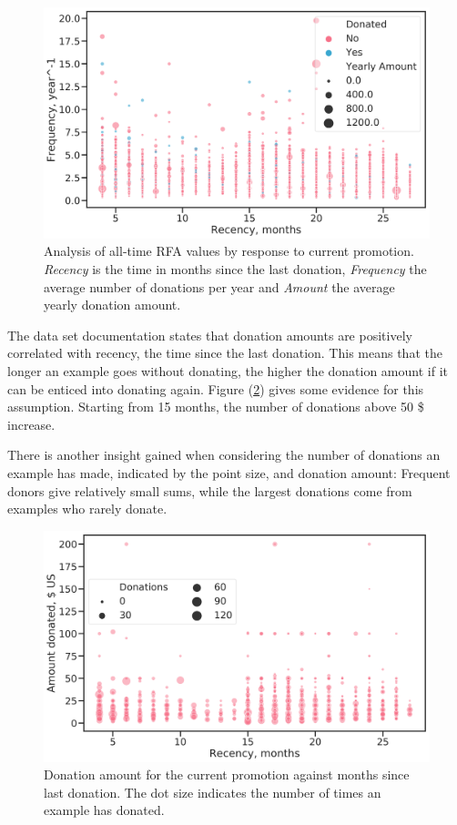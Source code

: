 \documentclass[
  11pt,
  a4paper,
  DIV=12,captions=tableheading,oneside,titlepage]{scrbook}
\begin{document}
\begin{figure}

{\centering \includegraphics[width=0.7\linewidth]{figures/eda/rfa-alltime-current-donors} 

}

\caption{Analysis of all-time RFA values by response to current promotion. \emph{Recency} is the time in months since the last donation, \emph{Frequency} the average number of donations per year and \emph{Amount} the average yearly donation amount.}\label{fig:rfa-alltime}
\end{figure}

The data set documentation states that donation amounts are positively correlated with recency, the time since the last donation. This means that the longer an example goes without donating, the higher the donation amount if it can be enticed into donating again. Figure (\ref{fig:donations-vs-time}) gives some evidence for this assumption. Starting from 15 months, the number of donations above 50 \$ increase.

There is another insight gained when considering the number of donations an example has made, indicated by the point size, and donation amount: Frequent donors give relatively small sums, while the largest donations come from examples who rarely donate.



\begin{figure}

{\centering \includegraphics[width=0.7\linewidth]{figures/eda/donations-vs-time-since-last-size-nbr-donations} 

}

\caption{Donation amount for the current promotion against months since last donation. The dot size indicates the number of times an example has donated.}\label{fig:donations-vs-time}
\end{figure}
\end{document}
